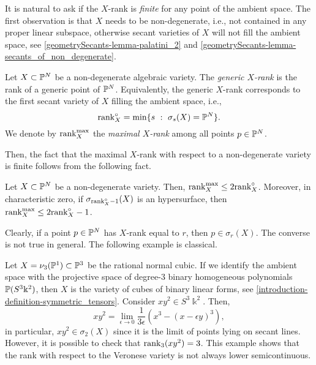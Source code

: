  It is natural to ask if the $X$-rank is \emph{finite} for any point of the ambient space. The first observation is that $X$ needs to be non-degenerate, i.e., not contained in any proper linear subspace, otherwise secant varieties of $X$ will not fill the ambient space, see \ref{geometrySecants-lemma-palatini_2} and \ref{geometrySecants-lemma-secants_of_non_degenerate}. 
 
 \begin{definition}
     \label{geometrySecants-definition-generic_rank}
     Let $X \subset \mathbb{P}^N$ be a non-degenerate algebraic variety. The \emph{generic $X$-rank} is the rank of a generic point of $\mathbb{P}^N$. Equivalently, the generic $X$-rank corresponds to the first secant variety of $X$ filling the ambient space, i.e., 
     \[
         \mathrm{rank}_X^\circ = \min\{s ~:~ \sigma_s(X) = \mathbb{P}^N\}.
     \]
     We denote by $\mathrm{rank}_X^{\max}$ the \emph{maximal $X$-rank} among all points $p \in \mathbb{P}^N$. 
 \end{definition}
 Then, the fact that the maximal $X$-rank with respect to a non-degenerate variety is finite follows from the following fact.
 
 \begin{theorem}[\cite{BT15}]
     Let $X \subset \mathbb{P}^N$ be a non-degenerate variety. Then, $\mathrm{rank}_X^{\max} \leq 2\mathrm{rank}_X^\circ$. Moreover, in characteristic zero, if $\sigma_{\mathrm{rank}^\circ_X-1}(X)$ is an hypersurface, then $\mathrm{rank}_X^{\max} \leq 2\mathrm{rank}_X^\circ-1$.
 \end{theorem}
 
 Clearly, if a point $p \in \mathbb{P}^N$ has $X$-rank equal to $r$, then $p \in \sigma_r(X)$. The converse is not true in general. The following example is classical.
 
 \begin{example}
 \label{geometrySecants-example-Xrank_semicontinuous}
   Let $X = \nu_3(\mathbb{P}^1) \subset \mathbb{P}^3$ be the rational normal cubic. If we identify the ambient space with the projective space of degree-$3$ binary homogeneous polynomials $\mathbb{P}(S^3\Bbbk^2)$, then $X$ is the variety of cubes of binary linear forms, see \ref{introduction-definition-symmetric_tensors}. Consider $xy^2 \in S^3\Bbbk^2$. Then, 
   \[
      xy^2 = \lim_{\epsilon \to 0} \frac{1}{3\epsilon}\left( x^3 - (x-\epsilon y)^3\right),
 \]
  in particular, $xy^2 \in \sigma_2(X)$ since it is the limit of points lying on secant lines. However, it is possible to check that $\mathrm{rank}_3(xy^2) = 3$. This example shows that the rank with respect to the Veronese variety is not always lower semicontinuous. 
 \end{example}
 
